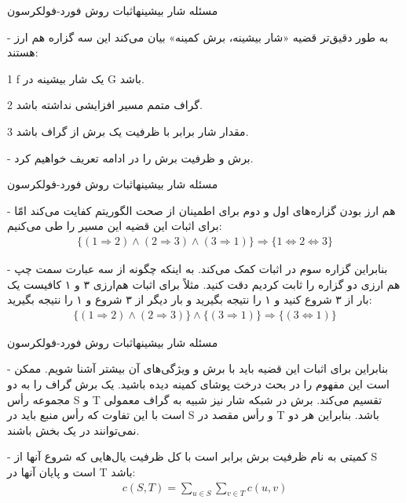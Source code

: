 \begin{itemframe}{مسئله شار بیشینه}{اثبات روش فورد-فولکرسون}
\item[-]
به طور دقیق‌تر قضیه «شار بیشینه، برش کمینه» بیان می‌کند این سه گزاره هم ارز هستند:
\item[1]
f یک شار بیشینه در G باشد.
\item[2]
گراف متمم  مسیر افزایشی نداشته باشد.
\item[3]
مقدار شار برابر با ظرفیت یک برش از گراف باشد.
\item[-]
برش و ظرفیت برش را در ادامه تعریف خواهیم کرد.
\end{itemframe}
\begin{itemframe}{مسئله شار بیشینه}{اثبات روش فورد-فولکرسون}
\item[-]
هم ارز بودن گزاره‌های اول و دوم برای اطمینان از صحت الگوریتم کفایت می‌کند امّا برای اثبات این قضیه این مسیر را طی می‌کنیم:
\begin{align*}
\{(1 \Rightarrow 2) \land (2 \Rightarrow 3) \land (3 \Rightarrow 1)\}
\Rightarrow
\{1 \Leftrightarrow 2 \Leftrightarrow 3 \}
\end{align*}
\item[-]
بنابراین گزاره سوم در اثبات کمک می‌کند. به اینکه چگونه از سه عبارت سمت چپ هم ارزی دو گزاره را ثابت کردیم دقت کنید. مثلاً برای اثبات هم‌ارزی ۳ و ۱ کافیست یک بار از ۳ شروع کنید و ۱ را نتیجه بگیرید و بار دیگر از ۳ شروع و ۱ را نتیجه بگیرید:
\begin{align*}
\{(1 \Rightarrow 2) \land (2 \Rightarrow 3)\}
\land
\{(3 \Rightarrow 1)\}
\Rightarrow
\{(3 \Leftrightarrow 1)\}
\end{align*}

\end{itemframe}

\begin{itemframe}{مسئله شار بیشینه}{اثبات روش فورد-فولکرسون}
\item[-]
بنابراین برای اثبات این قضیه باید با برش
 و ویژگی‌های آن بیشتر آشنا شویم. ممکن است این مفهوم را در بحث درخت پوشای کمینه دیده باشید. یک برش گراف را به دو مجموعه رأس S و T تقسیم می‌کند. برش در شبکه شار نیز شبیه به گراف معمولی است با این تفاوت که رأس منبع باید در S و رأس مقصد در T‌ باشد. بنابراین هر دو نمی‌توانند در یک بخش باشند.
\item[-]
کمیتی به نام ظرفیت برش برابر است با کل ظرفیت یال‌هایی که شروع آنها از S است و پایان آنها در T باشد:
\begin{align*}
c(S, T) = \sum_{u \in S}  \sum_{v \in T} c(u, v)
\end{align*}

\end{itemframe}

